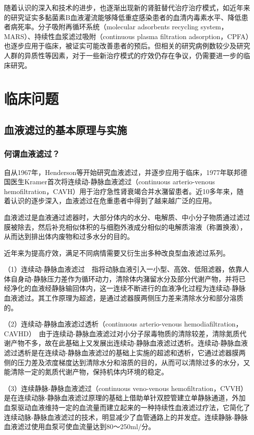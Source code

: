 随着认识的深入和技术的进步，也逐渐出现新的肾脏替代治疗治疗模式，如近年来的研究证实多黏菌素B血液灌流能够降低重症感染患者的血清内毒素水平、降低患者病死率。分子吸附再循环系统（molecular
adsorbents recycling system，MARS）、持续性血浆滤过吸附（continuous
plasma filtration
adsorption，CPFA）也逐步应用于临床，被证实可能改善患者的预后。但相关的研究病例数较少及研究人群的异质性等因素，对于一些新治疗模式的疗效仍存在争议，仍需要进一步的临床研究。

\section{临床问题}

\subsection{血液滤过的基本原理与实施}

\subsubsection{何谓血液滤过？}

自从1967年，Henderson等开始研究血液滤过，并逐步应用于临床，1977年联邦德国医生Kramer首次将连续动-静脉血液滤过（continuous
arterio-venous
hemofiltration，CAVH）用于治疗急性肾衰竭合并水潴留患者。近10多年来，随着认识的逐步深入，血液滤过在危重患者中得到了越来越广泛的应用。

血液滤过是血液通过滤器时，大部分体内的水分、电解质、中小分子物质通过滤过膜被除去，然后补充相似体积的与细胞外液成分相似的电解质溶液（称置换液），从而达到排出体内废物和过多水分的目的。

近年来为提高疗效，满足不同病情需要又衍生出多种改良型血液滤过系列。

（1）连续动-静脉血液滤过　指将动脉血液引入一小型、高效、低阻滤器，依靠人体自身动-静脉压力差作为循环动力，清除体内潴留水分及部分代谢产物，并将已经净化的血液经静脉输回体内，这一连续不断进行的血液净化过程为连续动-静脉血液滤过。其工作原理为超滤，是通过滤器膜两侧压力差来清除水分和部分溶质的。

（2）连续动-静脉血液滤过透析（continuous arterio-venous
hemodiafiltration，CAVHD）　由于连续动-静脉血液滤过对小分子尿毒物质的清除较差，清除氮质代谢产物不多，故在此基础上又发展出连续动-静脉血液滤过透析。连续动-静脉血液滤过透析是在连续动-静脉血液滤过的基础上实施的超滤和透析，它通过滤器膜两侧的压力差及浓度梯度达到清除水分和溶质的目的，从而可以清除过多的水分，又能清除一定的氮质代谢产物，保持机体内环境的稳定。

（3）连续静脉-静脉血液滤过（continuous veno-venous
hemofiltration，CVVH）　是在连续动脉-静脉血液滤过原理的基础上借助单针双腔管建立单静脉通道，外加血泵驱动血液维持一定的血流量而建立起来的一种持续性血液滤过疗法，它简化了连续动脉-静脉血液滤过的技术，明显减少了血管通路上的并发症。连续静脉-静脉血液滤过使用血泵可使血流量达到80～250ml/分。

